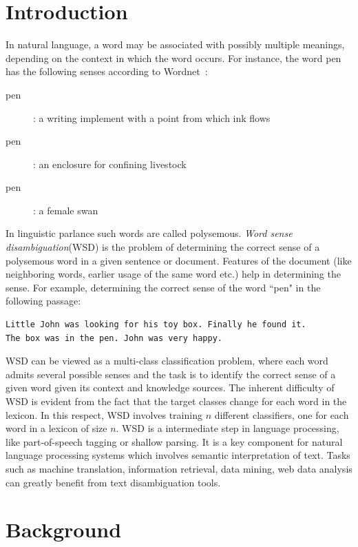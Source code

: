 \documentclass[12pt,letterpaper]{article}
\newcommand{\blue}[1]{\textcolor{RoyalBlue}{#1}}
\newcommand{\instructions}[1]{\blue{\textit{#1}}}
\begin{document}
\section{Introduction} 
\label{sec:introduction}
In natural language, a word may be associated with possibly multiple meanings, depending on the context in which the word occurs. For instance, the word pen has the following senses according to Wordnet~\cite{wordnet}:
\begin{description}
\item [pen] : a writing implement with a point from which ink flows
\item [pen] : an enclosure for confining livestock
\item [pen] : a female swan
\end{description}
In linguistic parlance such words are called polysemous. \emph{Word sense disambiguation}(WSD) is the problem of determining the correct sense of a polysemous word in a given sentence or document. Features of the document (like neighboring words, earlier usage of the same word etc.) help in determining the sense. For example, determining the correct sense of the word ``pen" in the following passage:
\begin{verbatim}
Little John was looking for his toy box. Finally he found it. 
The box was in the pen. John was very happy.
\end{verbatim}
WSD can be viewed as a multi-class classification problem, where each word admits several possible senses and the task is to identify the correct sense of a given word given its context and knowledge sources. The inherent difficulty of WSD is evident from the fact that the target classes change for each word in the lexicon. In this respect, WSD involves training $n$ different classifiers, one for each word in a lexicon of size $n$. 
WSD is a intermediate step in language processing, like part-of-speech tagging or shallow parsing. It is a key component for natural language processing systems which involves semantic interpretation of text. Tasks such as machine translation, information retrieval, data mining, web data analysis can greatly benefit from text disambiguation tools. 


\section{Background}
\label{sec:background}
\end{document}
